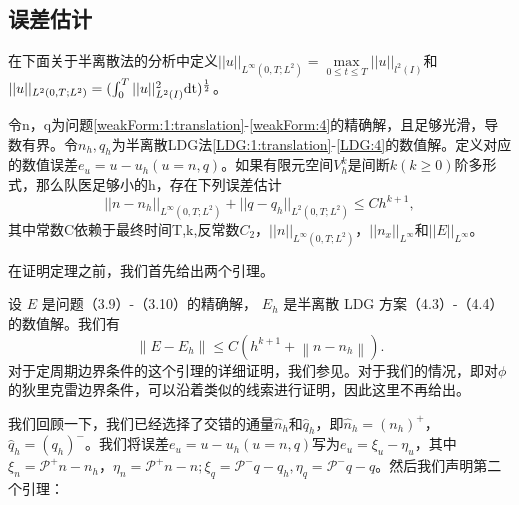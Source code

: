 \subsection{误差估计}
在下面关于半离散法的分析中定义$||u||_{L^{\infty}(0,T;L^2)}  = \max \limits_{0 \leq t \leq T}||u||_{l^2(I)}$和$||u||_{L^2(0,T;L^2)} = (\int_{0}^{T}||u||_{L^2(I)}^2\rm{d}t)^{\frac{1}{2}}$。
\begin{theorem}
    令n，q为问题\eqref{weakForm:1:translation}-\eqref{weakForm:4}的精确解，且足够光滑，导数有界。令$n_h,q_h$为半离散LDG法\eqref{LDG:1:translation}-\ref{LDG:4}的数值解。定义对应的数值误差$e_u = u - u_h (u = n,q)$。如果有限元空间$V_h^k$是间断$k(k\geq 0)$阶多形式，那么队医足够小的h，存在下列误差估计
    \begin{equation}
        ||n - n_h||_{L^{\infty}(0,T;L^2)} + ||q - q_h||_{L^2(0,T;L^2)} \leq C h^{k+1},
    \end{equation}
    其中常数C依赖于最终时间T,k,反常数$C_2$，$||n||_{L^{\infty}(0,T;L^2)}$，$||n_x||_{L^{\infty}}$和$||E||_{L^{\infty}}$。
\end{theorem}

在证明定理之前，我们首先给出两个引理。
\begin{lemma}
    设 $E$ 是问题（3.9）-（3.10）的精确解， $E_{h}$ 是半离散 LDG 方案（4.3）-（4.4）的数值解。我们有
    \begin{equation}
        \left\|E-E_{h}\right\| \leq C\left(h^{k+1}+\left\|n-n_{h}\right\|\right).
    \end{equation}
    对于定周期边界条件的这个引理的详细证明，我们参见\parencite{ayuso2011discontinuous}。对于我们的情况，即对$\phi$的狄里克雷边界条件，可以沿着类似的线索进行证明，因此这里不再给出。
\end{lemma}

我们回顾一下，我们已经选择了交错的通量$\hat{n}_{h}$和$\hat{q}_{h}$，即$\hat{n}_{h}=\left(n_{h}\right)^{+}$，$\hat{q}_{h}=\left(q_{h}\right)^{-}$。我们将误差$e_{u}=u-u_{h}(u=n, q)$写为$e_{u}=\xi_{u}-\eta_{u}$，其中$\xi_{n}=\mathcal{P}^{+} n-n_{h}$，$\eta_{n}=\mathcal{P}^{+} n-n ; \xi_{q}=\mathcal{P}^{-} q-q_{h}, \eta_{q}=\mathcal{P}^{-} q-q$。然后我们声明第二个引理：

